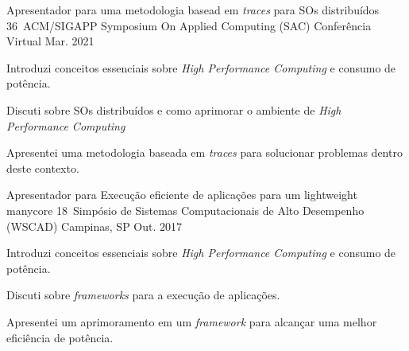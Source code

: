 

\begin{cventries}


  \cventry
    {Apresentador para uma metodologia basead em \textit{traces} para SOs
    distribuídos} %
    {36\textordmasculine~ACM/SIGAPP Symposium On Applied Computing (SAC)} %
    {Conferência Virtual} %
    {Mar. 2021} %
    {
      \begin{cvitems} %
      \item {Introduzi conceitos essenciais sobre \textit{High Performance
        Computing} e consumo de potência.}
      \item {Discuti sobre SOs distribuídos e como aprimorar o ambiente de
        \textit{High Performance Computing}}
      \item {Apresentei uma metodologia baseada em \textit{traces} para
        solucionar problemas dentro deste contexto.}
      \end{cvitems}
    }


  \cventry
    {Apresentador para Execução eficiente de aplicações para um lightweight
    manycore}
    {18\textordmasculine~Simpósio de Sistemas Computacionais de Alto Desempenho (WSCAD)} %
    {Campinas, SP} %
    {Out. 2017} %
    {
      \begin{cvitems} %
      \item {Introduzi conceitos essenciais sobre \textit{High Performance
        Computing} e consumo de potência.}
      \item {Discuti sobre \textit{frameworks} para a execução de aplicações.}
      \item {Apresentei um aprimoramento em um \textit{framework} para alcançar
        uma melhor eficiência de potência.}
      \end{cvitems}
    }

\end{cventries}
